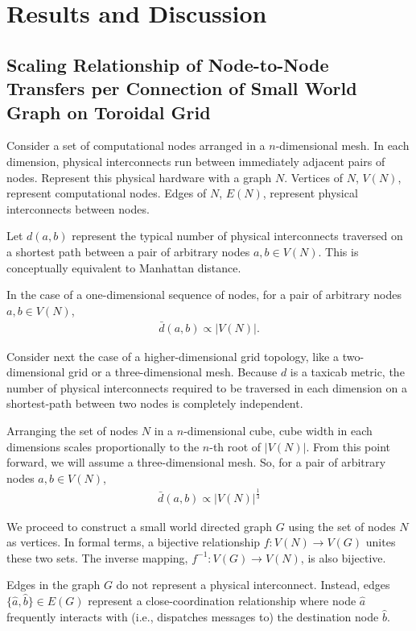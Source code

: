 \section{Results and Discussion}

\subsection{Scaling Relationship of Node-to-Node Transfers per Connection of Small World Graph on Toroidal Grid} \label{sec:scaling_toroidal}

Consider a set of computational nodes arranged in a $n$-dimensional mesh.
In each dimension, physical interconnects run between immediately adjacent pairs of nodes.
Represent this physical hardware with a graph $N$.
Vertices of $N$, $V(N)$, represent computational nodes.
Edges of $N$, $E(N)$, represent physical interconnects between nodes.

Let $d(a,b)$ represent the typical number of physical interconnects traversed on a shortest path between a pair of arbitrary nodes $a, b \in V(N)$.
This is conceptually equivalent to Manhattan distance.

In the case of a one-dimensional sequence of nodes, for a pair of arbitrary nodes $a,b \in V(N)$,
\begin{align*}
\bar{d}(a,b) \propto |V(N)|.
\end{align*}

Consider next the case of a higher-dimensional grid topology, like a two-dimensional grid or a three-dimensional mesh.
Because $d$ is a taxicab metric, the number of physical interconnects required to be traversed in each dimension on a shortest-path between two nodes is completely independent.

Arranging the set of nodes $N$ in a $n$-dimensional cube, cube width in each dimensions scales proportionally to the $n$-th root of $|V(N)|$.
From this point forward, we will assume a three-dimensional mesh.
So, for a pair of arbitrary nodes $a,b \in V(N)$,
\begin{align} \label{eqn:mesh_prop}
\bar{d}(a, b) \propto |V(N)|^{\frac{1}{3}}
\end{align}

We proceed to construct a small world directed graph $G$ using the set of nodes $N$ as vertices.
In formal terms, a bijective relationship $f: V(N) \rightarrow V(G)$ unites these two sets.
The inverse mapping, $f^{-1}: V(G) \rightarrow V(N)$, is also bijective.

Edges in the graph $G$ do not represent a physical interconnect.
Instead, edges $\{\hat{a}, \hat{b}\} \in E(G)$ represent a close-coordination relationship where node $\hat{a}$ frequently interacts with (i.e., dispatches messages to) the destination node $\hat{b}$.

